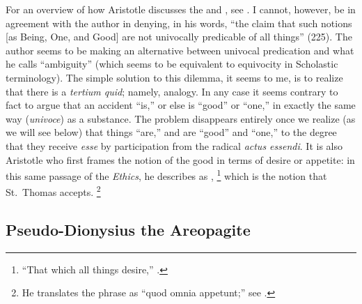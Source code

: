 {{For an overview of how Aristotle discusses the  and , see \cite{loux:aristotle}. I cannot, however, be in agreement with the author in denying, in his words, ``the claim that such notions [as Being, One, and Good] are not univocally predicable of all things'' (225). The author seems to be making an alternative between univocal predication and what he calls ``ambiguity'' (which seems to be equivalent to equivocity in Scholastic terminology). The simple solution to this dilemma, it seems to me, is to realize that there is a \emph{tertium quid}; namely, analogy. In any case it seems contrary to fact to argue that an accident ``is,'' or else is ``good'' or ``one,'' in exactly the same way (\emph{univoce}) as a substance. The problem disappears entirely once we realize (as we will see below) that things ``are,'' and are ``good'' and ``one,'' to the degree that they receive \emph{esse} by participation from the radical \emph{actus essendi}.}
%
It is also Aristotle who first frames the notion of the good in terms of desire or appetite: in this same passage of the \emph{Ethics}, he describes  as ,%
%
\footnote{\enquote{That which all things desire,} \cite[I, 1, 1094a3]{aristotle:ethics}.}
%
which is the notion that St.~Thomas accepts.%
%
\footnote{He translates the phrase as \enquote{quod omnia appetunt;} see \cite[I, q.~5, a.~1, co.]{st:summa}.}
%

\subsection{Pseudo-Dionysius the Areopagite}

}
